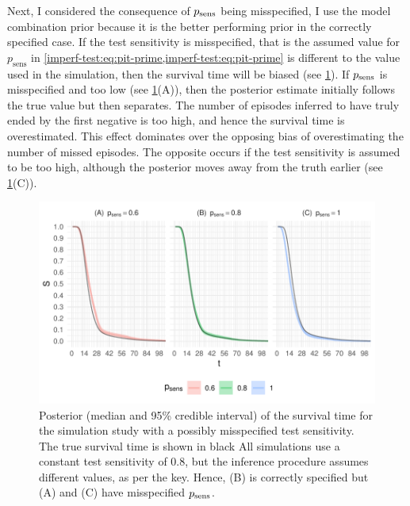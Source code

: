 \documentclass[thesis.tex]{subfiles}
\begin{document}
Next, I considered the consequence of $p_\text{sens}$ being misspecified, I use the model combination prior because it is the better performing prior in the correctly specified case.
If the test sensitivity is misspecified, that is the assumed value for $p_\text{sens}$ in \cref{imperf-test:eq:pit-prime,imperf-test:eq:pit-prime} is different to the value used in the simulation, then the survival time will be biased (see \cref{imperf-test:fig:misspecified-test-sensitivity}).
If $p_\text{sens}$ is misspecified and too low (see \cref{imperf-test:fig:misspecified-test-sensitivity}(A)), then the posterior estimate initially follows the true value but then separates.
The number of episodes inferred to have truly ended by the first negative is too high, and hence the survival time is overestimated.
This effect dominates over the opposing bias of overestimating the number of missed episodes.
The opposite occurs if the test sensitivity is assumed to be too high, although the posterior moves away from the truth earlier (see \cref{imperf-test:fig:misspecified-test-sensitivity}(C)).
\begin{figure}
    \includegraphics[width=\textwidth]{cis-imperfect-testing/sim-misspecified-sensitivity}
  \caption[Simulation study results with misspecified test sensitivity]{%
    Posterior (median and 95\% credible interval) of the survival time for the simulation study with a possibly misspecified test sensitivity.
    The true survival time is shown in black
    All simulations use a constant test sensitivity of 0.8, but the inference procedure assumes different values, as per the key.
    Hence, (B) is correctly specified but (A) and (C) have misspecified $p_\text{sens}$.
  }
  \label{imperf-test:fig:misspecified-test-sensitivity}
\end{figure}
\end{document}
